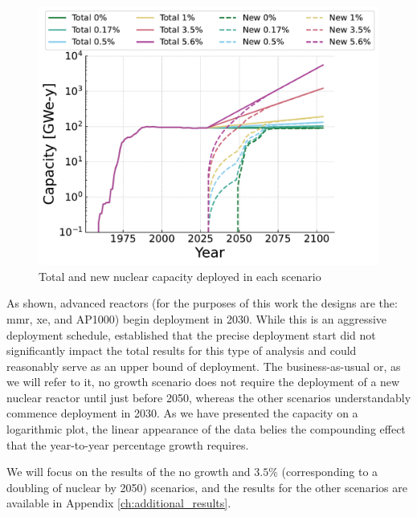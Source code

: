 \begin{figure}[H]
    \centering
    \includegraphics[scale=0.7]{images/results/deployment_calcs/total_new_capacity_scenarios.pdf}
    \caption{Total and new nuclear capacity deployed in each scenario}
    \label{fig:dep_goals}
\end{figure}

As shown, advanced reactors (for the purposes of this work the designs are the:
\gls{mmr}, \gls{xe}, and AP1000) begin deployment in 2030. While this is an
aggressive deployment schedule, \cite{bachmann_thesis_2023} established that
the precise deployment start did not significantly impact the total results for
this type of analysis and could reasonably serve as an upper bound of
deployment. The business-as-usual or, as we will refer to it, no growth
scenario does not require the deployment of a new nuclear reactor until just
before 2050, whereas the other scenarios understandably commence deployment in
2030. As we have presented the capacity on a logarithmic plot, the linear
appearance of the data belies the compounding effect that the year-to-year
percentage growth requires.

We will focus on the results of the no growth and $3.5\%$ (corresponding to a doubling of nuclear by 2050) scenarios, and the results for the other scenarios are available in Appendix \ref{ch:additional_results}.